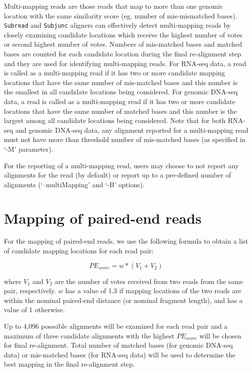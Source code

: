 \documentclass[12pt]{report}
\newcommand{\code}[1]{{\small\texttt{#1}}}
\begin{document}
Multi-mapping reads are those reads that map to more than one genomic location with the same similarity score (eg. number of mis-mismatched bases).
\code{Subread} and \code{Subjunc} aligners can effectively detect multi-mapping reads by closely examining candidate locations which receive the highest number of votes or second highest number of votes.
Numbers of mis-matched bases and matched bases are counted for each candidate location during the final re-alignment step and they are used for identifying multi-mapping reads.
For RNA-seq data, a read is called as a multi-mapping read if it has two or more candidate mapping locations that have the same number of mis-matched bases and this number is the smallest in all candidate locations being considered.
For genomic DNA-seq data, a read is called as a multi-mapping read if it has two or more candidate locations that have the same number of matched bases and this number is the largest among all candidate locations being considered.
Note that for both RNA-seq and genomic DNA-seq data, any alignment reported for a multi-mapping read must not have more than threshold number of mis-matched bases (as specified in `-M' parameter).

For the reporting of a multi-mapping read, users may choose to not report any alignments for the read (by default) or report up to a pre-defined number of alignments (`--multiMapping' and `-B' options).


\section{Mapping of paired-end reads}

For the mapping of paired-end reads, we use the following formula to obtain a list of candidate mapping locations for each read pair:

$$PE_{score} = w * (V_1 + V_2) $$

where $V_1$ and $V_2$ are the number of votes received from two reads from the same pair, respectively.
$w$ has a value of 1.3 if mapping locations of the two reads are within the nominal paired-end distance (or nominal fragment length), and has a value of 1 otherwise.

Up to 4,096 posssible alignments will be examined for each read pair and a maximum of three candidate alignments with the highest $PE_{score}$ will be chosen for final re-alignment.
Total number of matched bases (for genomic DNA-seq data) or mis-matched bases (for RNA-seq data) will be used to determine the best mapping in the final re-alignment step.
\end{document}
